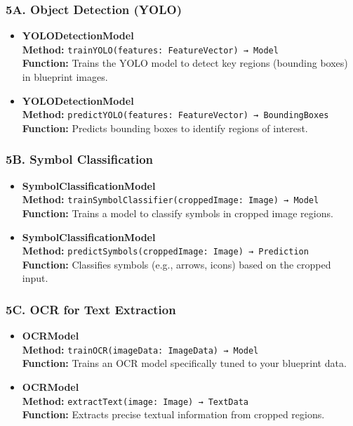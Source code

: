 \documentclass{article}
\begin{document}
\subsubsection{5A. Object Detection (YOLO)}
\begin{itemize}
    \item \textbf{YOLODetectionModel} \\
    \textbf{Method:} \verb|trainYOLO(features: FeatureVector) → Model| \\
    \textbf{Function:} Trains the YOLO model to detect key regions (bounding boxes) in blueprint images.
    
    \item \textbf{YOLODetectionModel} \\
    \textbf{Method:} \verb|predictYOLO(features: FeatureVector) → BoundingBoxes| \\
    \textbf{Function:} Predicts bounding boxes to identify regions of interest.
\end{itemize}

\subsubsection{5B. Symbol Classification}
\begin{itemize}
    \item \textbf{SymbolClassificationModel} \\
    \textbf{Method:} \verb|trainSymbolClassifier(croppedImage: Image) → Model| \\
    \textbf{Function:} Trains a model to classify symbols in cropped image regions.
    
    \item \textbf{SymbolClassificationModel} \\
    \textbf{Method:} \verb|predictSymbols(croppedImage: Image) → Prediction| \\
    \textbf{Function:} Classifies symbols (e.g., arrows, icons) based on the cropped input.
\end{itemize}

\subsubsection{5C. OCR for Text Extraction}
\begin{itemize}
    \item \textbf{OCRModel} \\
    \textbf{Method:} \verb|trainOCR(imageData: ImageData) → Model| \\
    \textbf{Function:} Trains an OCR model specifically tuned to your blueprint data.
    
    \item \textbf{OCRModel} \\
    \textbf{Method:} \verb|extractText(image: Image) → TextData| \\
    \textbf{Function:} Extracts precise textual information from cropped regions.
\end{itemize}
\end{document}
